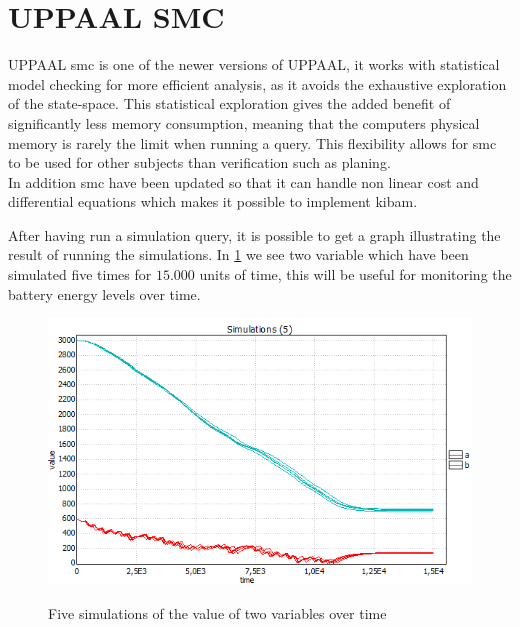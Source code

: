 \section{UPPAAL SMC}\label{sec:smc}
UPPAAL \gls{smc} is one of the newer versions of UPPAAL, it works with statistical model checking for more efficient analysis, as it avoids the exhaustive exploration of the state-space. This statistical exploration gives the added benefit of significantly less memory consumption\cite{cs_smc}, meaning that the computers physical memory is rarely the limit when running a query. This flexibility allows for \gls{smc} to be used for other subjects than verification such as planing\cite{cs_smc}. \\
In addition \gls{smc} have been updated so that it can handle non linear cost and differential equations which makes it possible to implement \gls{kibam}.

After having run a simulation query, it is possible to get a graph illustrating the result of running the simulations. In \cref{fig:simab} we see two variable which have been simulated five times for $15.000$ units of time, this will be useful for monitoring the battery energy levels over time.

\begin{figure}[!h]
	\includegraphics[width=\textwidth]{graphics/simab.png}
	\label{fig:simab}
	\caption{Five simulations of the value of two variables  over time}
\end{figure}

